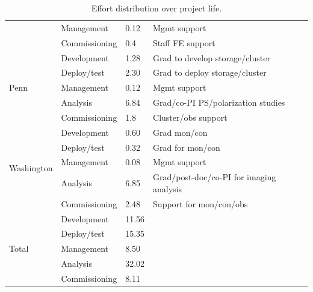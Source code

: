 \documentclass[preprint]{aastex}
\begin{document}
\begin{table}[htb]
\begin{tabular}{| p{1in} | p{1in} | p{0.5in} | p{3in} |}
                                                & Management  & 0.12  & Mgmt support\\ 
                                                & Commissioning & 0.4 & Staff FE support \\ \hline
\multirow{5}{*}{Penn}              & Development & 1.28 & Grad to develop storage/cluster \\ 
                                                & Deploy/test   & 2.30  & Grad to deploy storage/cluster\\
                                                & Management  &  0.12 & Mgmt support \\ 
                                                & Analysis         & 6.84 & Grad/co-PI PS/polarization studies \\ 
                                                & Commissioning & 1.8 & Cluster/obs support \\ \hline
\multirow{5}{*}{Washington} & Development & 0.60 & Grad mon/con \\
                                                & Deploy/test   & 0.32 & Grad for mon/con \\ 
                                                & Management  &  0.08 & Mgmt support \\ 
                                                & Analysis         & 6.85 & Grad/post-doc/co-PI for imaging analysis \\ 
                                                & Commissioning     & 2.48 & Support for mon/con/obs \\ \hline
\multirow{5}{*}{Total} & Development & 11.56 &  \\
                                                & Deploy/test   & 15.35 &  \\ 
                                                & Management  &  8.50 &  \\ 
                                                & Analysis         & 32.02 &  \\ 
                                                & Commissioning   & 8.11 &  \\ \hline
\end{tabular}
\caption{Effort distribution over project life.}
\label{tab:fte}
\end{table}
\end{document}
